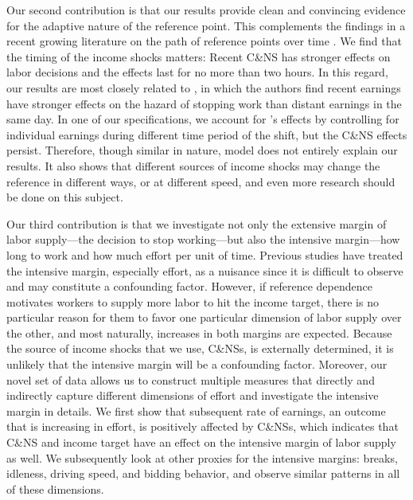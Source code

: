 \documentclass[reviewmode]{restud}
\begin{document}
Our second contribution is that our results provide clean and convincing evidence for the adaptive nature of the reference point. This complements the findings in a recent growing literature on the path of reference points over time \citep{dellavigna2017reference,thakral2018daily}. We find that the timing of the income shocks matters: Recent C\&NS has stronger effects on labor decisions and the effects last for no more than two hours. In this regard, our results are most closely related to \citet{thakral2018daily}, in which the authors find recent earnings have stronger effects on the hazard of stopping work than distant earnings in the same day. In one of our specifications, we account for \citet{thakral2018daily}'s effects by controlling for individual earnings during different time period of the shift, but the C\&NS effects persist. Therefore, though similar in nature, \citet{thakral2018daily} model does not entirely explain our results. It also shows that different sources of income shocks may change the reference in different ways, or at different speed, and even more research should be done on this subject.


Our third contribution is that we investigate not only the extensive margin of labor supply---the decision to stop working---but also the intensive margin---how long to work and how much effort per unit of time. Previous studies have treated the intensive margin, especially effort, as a nuisance since it is difficult to observe and may constitute a confounding factor. However, if reference dependence motivates workers to supply more labor to hit the income target, there is no particular reason for them to favor one particular dimension of labor supply over the other, and most naturally, increases in both margins are expected. Because the source of income shocks that we use, C\&NSs, is externally determined, it is unlikely that the intensive margin will be a confounding factor. Moreover, our novel set of data allows us to construct multiple  measures that directly and indirectly capture different dimensions of effort and investigate the intensive margin in details. We first show that subsequent rate of earnings, an outcome that is increasing in effort, is positively affected by C\&NSs, which indicates that C\&NS and income target have an effect on the intensive margin of labor supply as well. We subsequently look at other proxies for the intensive margins: breaks, idleness, driving speed, and bidding behavior, and observe similar patterns in all of these dimensions.
\end{document}
